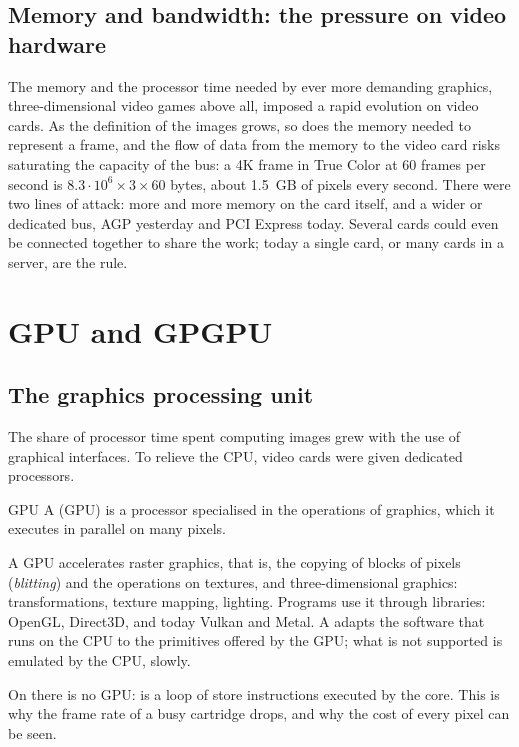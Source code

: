 \subsection{Memory and bandwidth: the pressure on video hardware}

The memory and the processor time needed by ever more demanding graphics,
three-dimensional video games above all, imposed a rapid evolution on video
cards. As the definition of the images grows, so does the memory needed to
represent a frame, and the flow of data from the memory to the video card
risks saturating the capacity of the bus: a 4K frame in True Color at 60
frames per second is $8.3\cdot 10^{6}\times 3\times 60$ bytes, about 1.5~GB
of pixels every second. There were two lines of attack: more and more memory
on the card itself, and a wider or dedicated bus, AGP yesterday and PCI
Express today. Several cards could even be connected together to share the
work; today a single card, or many cards in a server, are the rule.

\section{GPU and GPGPU}

\subsection{The graphics processing unit}

The share of processor time spent computing images grew with the use of
graphical interfaces. To relieve the CPU, video cards were given dedicated
processors.

\begin{definition}{GPU}
A  (GPU) is a processor specialised in the
operations of graphics, which it executes in parallel on many pixels.
\end{definition}

A GPU accelerates raster graphics, that is, the copying of blocks of pixels
(\emph{blitting}) and the operations on textures, and three-dimensional
graphics: transformations, texture mapping, lighting. Programs use it through
libraries: OpenGL, Direct3D, and today Vulkan and Metal. A  adapts the software that runs on the CPU to the primitives offered by
the GPU; what is not supported is emulated by the CPU, slowly.

\begin{prgmachine}
On \prg there is no GPU:  is a loop of store
instructions executed by the \riscv core. This is why the frame rate of a
busy cartridge drops, and why the cost of every pixel can be seen.
\end{prgmachine}

